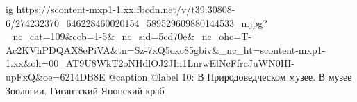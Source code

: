  
 
 
 
 

\ifcmt
  ig https://scontent-mxp1-1.xx.fbcdn.net/v/t39.30808-6/274232370_646228460020154_589529609880144533_n.jpg?_nc_cat=109&ccb=1-5&_nc_sid=5cd70e&_nc_ohc=T-Ac2KVhPDQAX8ePiVA&tn=Sz-7xQ5oxc85gbiv&_nc_ht=scontent-mxp1-1.xx&oh=00_AT9U8WkT2oNHdlOJ2JIn1LnrwElNcFfrcJuWN0HI-upFxQ&oe=6214DB8E
  @caption @label 10: В Природоведческом музее. В музее Зоологии. Гигантский Японский краб
\fi
